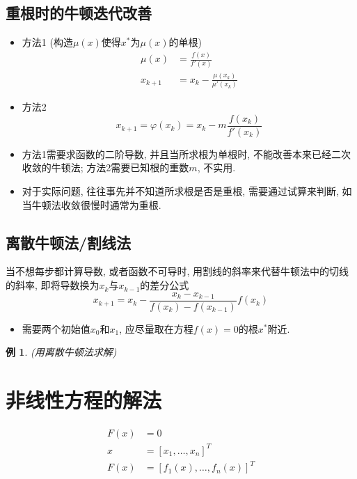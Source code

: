 \documentclass[twoside]{article}
\newtheorem{eg}{例}[section]
\begin{document}
\subsection{重根时的牛顿迭代改善}
\begin{itemize}
  \item 方法1 (构造$\mu(x)$使得$x^*$为$\mu(x)$的单根)
    \begin{equation}
      \begin{aligned}
        \mu(x) &= \frac{f(x)}{f'(x)} \\
        x_{k+1} &= x_k - \frac{\mu(x_k)}{\mu'(x_k)}
      \end{aligned}
    \end{equation}
  \item 方法2
    \begin{equation}
      x_{k+1} = \varphi(x_k) = x_k - m \frac{f(x_k)}{f'(x_k)}
    \end{equation}
  \item 方法1需要求函数的二阶导数, 并且当所求根为单根时, 不能改善本来已经二次收敛的牛顿法; 方法2需要已知根的重数$m$, 不实用.
  \item 对于实际问题, 往往事先并不知道所求根是否是重根, 需要通过试算来判断, 如当牛顿法收敛很慢时通常为重根.
\end{itemize}


\subsection{离散牛顿法/割线法}
当不想每步都计算导数, 或者函数不可导时, 用割线的斜率来代替牛顿法中的切线的斜率, 即将导数换为$x_k$与$x_{k-1}$的差分公式
\begin{equation}
  x_{k+1} = x_k - \frac{x_k - x_{k-1}}{f(x_k) - f(x_{k-1})} f(x_k)
\end{equation}
\begin{itemize}
  \item 需要两个初始值$x_0$和$x_1$, 应尽量取在方程$f(x)=0$的根$x^*$附近. 
\end{itemize}
\begin{eg}
  (用离散牛顿法求解)
\end{eg}

\section{非线性方程的解法}\label{sec:fei_xian_xin_fang_chen_de_jie_fa_}
\begin{equation}
  \begin{aligned}
    F(x)&=0 \\
    x&={ [x_1, \ldots, x_n] }^T\\
    F(x)&={ [f_1(x), \ldots, f_n(x)] }^T
  \end{aligned}
\end{equation}
\end{document}
